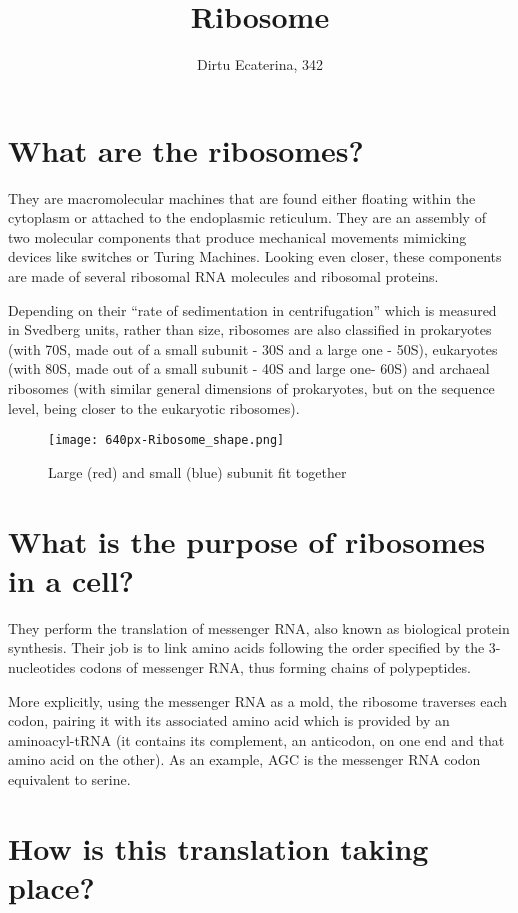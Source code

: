 \documentclass{article}
\title{Ribosome}
\author{Dirtu Ecaterina, 342}
\begin{document}
\maketitle

\newpage

\section{What are the ribosomes?}

They are macromolecular machines that are found either floating within the cytoplasm or attached to the endoplasmic reticulum. They are an assembly of two molecular components that produce mechanical movements mimicking devices like switches or Turing Machines. Looking even closer, these components are made of several ribosomal RNA molecules and ribosomal proteins. 

Depending on their “rate of sedimentation in centrifugation” which is measured in Svedberg units, rather than size, ribosomes are also classified in prokaryotes (with 70S, made out of a small subunit - 30S and a large one - 50S), eukaryotes (with 80S, made out of a small subunit - 40S and large one- 60S) and archaeal ribosomes (with similar general dimensions of prokaryotes, but on the sequence level, being closer to the eukaryotic ribosomes).

\begin{figure} [h]
\texttt{[image: 640px-Ribosome\_shape.png]}
\caption{Large (red) and small (blue) subunit fit together \cite{Wikipedia}}
\end{figure}

\section{What is the purpose of ribosomes in a cell? }

They perform the translation of messenger RNA, also known as biological protein synthesis. Their job is to link amino acids following the order specified by the 3-nucleotides codons of messenger RNA, thus forming chains of polypeptides. 

More explicitly, using the messenger RNA as a mold, the ribosome traverses each codon, pairing it with its associated amino acid which is provided by an aminoacyl-tRNA (it contains its complement, an anticodon, on one end and that amino acid on the other). As an example, AGC is the messenger RNA codon equivalent to serine.

\section{How is this translation taking place?}
\end{document}
